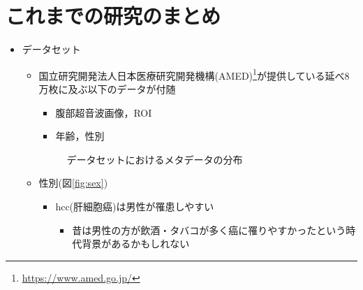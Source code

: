 \documentclass[a4j]{ujarticle}
\newcommand{\Fref}[1]{\mbox{図\ref{fig:#1}}}
\begin{document}
	\section{これまでの研究のまとめ}
		\begin{itemize}
			\item データセット
			\begin{itemize}
				\item 国立研究開発法人日本医療研究開発機構(AMED)\footnote{\url{https://www.amed.go.jp/}}が提供している延べ8万枚に及ぶ以下のデータが付随
				\begin{itemize}
					\item 腹部超音波画像，ROI
					\item 年齢，性別
				\end{itemize}
                \begin{figure}[h]
					\centering
                    \caption{データセットにおけるメタデータの分布}
                \end{figure}
				\item 性別(\Fref{sex})
				\begin{itemize}
					\item hcc(肝細胞癌)は男性が罹患しやすい
					\begin{itemize}
                        \item 昔は男性の方が飲酒・タバコが多く癌に罹りやすかったという時代背景があるかもしれない

\end{itemize}
\end{itemize}
\end{itemize}
\end{itemize}
\end{document}
